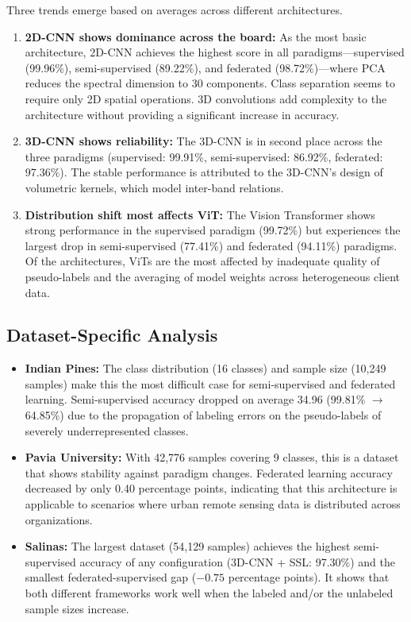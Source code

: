 Three trends emerge based on averages across different architectures.
\begin{enumerate}
    \item \textbf{2D-CNN shows dominance across the board:}  As the most basic architecture, 2D-CNN achieves the highest score in all paradigms—supervised (99.96\%), semi-supervised (89.22\%), and federated (98.72\%)—where PCA reduces the spectral dimension to 30 components. Class separation seems to require only 2D spatial operations. 3D convolutions add complexity to the architecture without providing a significant increase in accuracy.

    \item \textbf{3D-CNN shows reliability:} The 3D-CNN is in second place across the three paradigms (supervised: 99.91\%, semi-supervised: 86.92\%, federated: 97.36\%). The stable performance is attributed to the 3D-CNN’s design of volumetric kernels, which model inter-band relations.

    \item \textbf{Distribution shift most affects ViT:} The Vision Transformer shows strong performance in the supervised paradigm (99.72\%) but experiences the largest drop in semi-supervised (77.41\%) and federated (94.11\%) paradigms. Of the architectures, ViTs are the most affected by inadequate quality of pseudo-labels and the averaging of model weights across heterogeneous client data.
\end{enumerate}

\subsection{Dataset-Specific Analysis}
\begin{itemize}
    \item \textbf{Indian Pines:} The class distribution (16 classes) and sample size (10,249 samples) make this the most difficult case for semi-supervised and federated learning. Semi-supervised accuracy dropped on average 34.96 (99.81\% $\to$ 64.85\%) due to the propagation of labeling errors on the pseudo-labels of severely underrepresented classes.

    \item \textbf{Pavia University:} With 42,776 samples covering 9 classes, this is a dataset that shows stability against paradigm changes. Federated learning accuracy decreased by only 0.40 percentage points, indicating that this architecture is applicable to scenarios where urban remote sensing data is distributed across organizations.

    \item \textbf{Salinas:} The largest dataset (54,129 samples) achieves the highest semi-supervised accuracy of any configuration (3D-CNN + SSL: 97.30\%) and the smallest federated-supervised gap ($-0.75$ percentage points). It shows that both different frameworks work well when the labeled and/or the unlabeled sample sizes increase.
\end{itemize}

